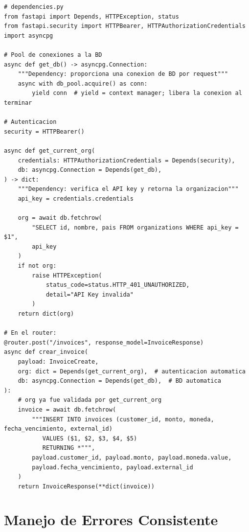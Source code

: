 \documentclass[11pt,a4paper]{article}
\begin{document}
\begin{lstlisting}[style=python]
# dependencies.py
from fastapi import Depends, HTTPException, status
from fastapi.security import HTTPBearer, HTTPAuthorizationCredentials
import asyncpg

# Pool de conexiones a la BD
async def get_db() -> asyncpg.Connection:
    """Dependency: proporciona una conexion de BD por request"""
    async with db_pool.acquire() as conn:
        yield conn  # yield = context manager; libera la conexion al terminar

# Autenticacion
security = HTTPBearer()

async def get_current_org(
    credentials: HTTPAuthorizationCredentials = Depends(security),
    db: asyncpg.Connection = Depends(get_db),
) -> dict:
    """Dependency: verifica el API key y retorna la organizacion"""
    api_key = credentials.credentials

    org = await db.fetchrow(
        "SELECT id, nombre, pais FROM organizations WHERE api_key = $1",
        api_key
    )
    if not org:
        raise HTTPException(
            status_code=status.HTTP_401_UNAUTHORIZED,
            detail="API Key invalida"
        )
    return dict(org)

# En el router:
@router.post("/invoices", response_model=InvoiceResponse)
async def crear_invoice(
    payload: InvoiceCreate,
    org: dict = Depends(get_current_org),  # autenticacion automatica
    db: asyncpg.Connection = Depends(get_db),  # BD automatica
):
    # org ya fue validada por get_current_org
    invoice = await db.fetchrow(
        """INSERT INTO invoices (customer_id, monto, moneda, fecha_vencimiento, external_id)
           VALUES ($1, $2, $3, $4, $5)
           RETURNING *""",
        payload.customer_id, payload.monto, payload.moneda.value,
        payload.fecha_vencimiento, payload.external_id
    )
    return InvoiceResponse(**dict(invoice))
\end{lstlisting}

\section{Manejo de Errores Consistente}
\end{document}
